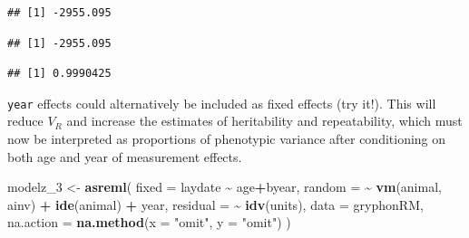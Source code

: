 \documentclass[
  12pt,
]{book}
\newenvironment{Shaded}{\begin{snugshade}}{\end{snugshade}}
\newcommand{\DataTypeTok}[1]{\textcolor[rgb]{0.13,0.29,0.53}{#1}}
\newcommand{\DecValTok}[1]{\textcolor[rgb]{0.00,0.00,0.81}{#1}}
\newcommand{\KeywordTok}[1]{\textcolor[rgb]{0.13,0.29,0.53}{\textbf{#1}}}
\newcommand{\NormalTok}[1]{#1}
\newcommand{\OperatorTok}[1]{\textcolor[rgb]{0.81,0.36,0.00}{\textbf{#1}}}
\newcommand{\StringTok}[1]{\textcolor[rgb]{0.31,0.60,0.02}{#1}}
\begin{document}
\begin{Shaded}
\end{Shaded}

\begin{verbatim}
## [1] -2955.095
\end{verbatim}

\begin{Shaded}
\end{Shaded}

\begin{verbatim}
## [1] -2955.095
\end{verbatim}

\begin{Shaded}
\end{Shaded}

\begin{verbatim}
## [1] 0.9990425
\end{verbatim}

\texttt{year} effects could alternatively be included as fixed effects (try it!). This will reduce \(V_R\) and increase the estimates of heritability and repeatability, which must now be interpreted as proportions of phenotypic variance after conditioning on both age and year of measurement effects.

\begin{Shaded}
\begin{Highlighting}[]
\NormalTok{modelz\_}\DecValTok{3}\NormalTok{ \textless{}{-}}\StringTok{ }\KeywordTok{asreml}\NormalTok{(}
  \DataTypeTok{fixed =}\NormalTok{ laydate }\OperatorTok{\textasciitilde{}}\StringTok{ }\NormalTok{age}\OperatorTok{+}\NormalTok{byear,}
  \DataTypeTok{random =} \OperatorTok{\textasciitilde{}}\StringTok{ }\KeywordTok{vm}\NormalTok{(animal, ainv) }\OperatorTok{+}\StringTok{ }\KeywordTok{ide}\NormalTok{(animal) }\OperatorTok{+}
\StringTok{    }\NormalTok{year,}
  \DataTypeTok{residual =} \OperatorTok{\textasciitilde{}}\StringTok{ }\KeywordTok{idv}\NormalTok{(units),}
  \DataTypeTok{data =}\NormalTok{ gryphonRM,}
  \DataTypeTok{na.action =} \KeywordTok{na.method}\NormalTok{(}\DataTypeTok{x =} \StringTok{"omit"}\NormalTok{, }\DataTypeTok{y =} \StringTok{"omit"}\NormalTok{)}
\NormalTok{)}
\end{Highlighting}
\end{Shaded}
\end{document}
